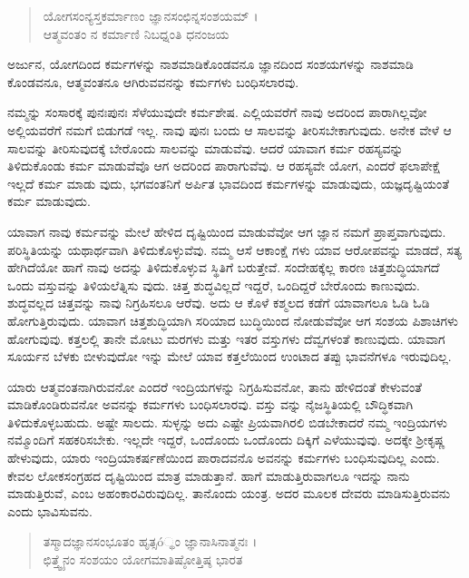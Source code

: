 \begin{verse}
ಯೋಗಸಂನ್ಯಸ್ತಕರ್ಮಾಣಂ ಜ್ಞಾನಸಂಛಿನ್ನಸಂಶಯಮ್ ।\\ಆತ್ಮವಂತಂ ನ ಕರ್ಮಾಣಿ ನಿಬಧ್ನಂತಿ ಧನಂಜಯ 
\end{verse}

{\small ಅರ್ಜುನ, ಯೋಗದಿಂದ ಕರ್ಮಗಳನ್ನು ನಾಶಮಾಡಿಕೊಂಡವನೂ ಜ್ಞಾನದಿಂದ ಸಂಶಯಗಳನ್ನು ನಾಶಮಾಡಿ ಕೊಂಡವನೂ, ಆತ್ಮವಂತನೂ ಆಗಿರುವವನನ್ನು ಕರ್ಮಗಳು ಬಂಧಿಸಲಾರವು.}

ನಮ್ಮನ್ನು ಸಂಸಾರಕ್ಕೆ ಪುನಃಪುನಃ ಸೆಳೆಯುವುದೇ ಕರ್ಮಶೇಷ. ಎಲ್ಲಿಯವರೆಗೆ ನಾವು ಅದರಿಂದ ಪಾರಾಗಿಲ್ಲವೋ ಅಲ್ಲಿಯವರೆಗೆ ನಮಗೆ ಬಿಡುಗಡೆ ಇಲ್ಲ. ನಾವು ಪುನಃ ಬಂದು ಆ ಸಾಲವನ್ನು ತೀರಿಸಬೇಕಾಗುವುದು. ಅನೇಕ ವೇಳೆ ಆ ಸಾಲವನ್ನು ತೀರಿಸುವುದಕ್ಕೆ ಬೇರೊಂದು ಸಾಲವನ್ನು ಮಾಡುವೆವು. ಆದರೆ ಯಾವಾಗ ಕರ್ಮ ರಹಸ್ಯವನ್ನು ತಿಳಿದುಕೊಂಡು ಕರ್ಮ ಮಾಡುವೆವೊ ಆಗ ಅದರಿಂದ ಪಾರಾಗುವೆವು. ಆ ರಹಸ್ಯವೇ ಯೋಗ, ಎಂದರೆ ಫಲಾಪೇಕ್ಷೆ ಇಲ್ಲದೆ ಕರ್ಮ ಮಾಡು ವುದು, ಭಗವಂತನಿಗೆ ಅರ್ಪಿತ ಭಾವದಿಂದ ಕರ್ಮಗಳನ್ನು ಮಾಡುವುದು, ಯಜ್ಞದೃಷ್ಟಿಯಂತೆ ಕರ್ಮ ಮಾಡುವುದು.

ಯಾವಾಗ ನಾವು ಕರ್ಮವನ್ನು ಮೇಲೆ ಹೇಳಿದ ದೃಷ್ಟಿಯಿಂದ ಮಾಡುವೆವೋ ಆಗ ಜ್ಞಾನ ನಮಗೆ ಪ್ರಾಪ್ತವಾಗುವುದು. ಪರಿಸ್ಥಿತಿಯನ್ನು ಯಥಾರ್ಥವಾಗಿ ತಿಳಿದುಕೊಳ್ಳುವೆವು. ನಮ್ಮ ಆಸೆ ಆಕಾಂಕ್ಷೆ ಗಳು ಯಾವ ಆರೋಪವನ್ನು ಮಾಡದೆ, ಸತ್ಯ ಹೇಗಿದೆಯೋ ಹಾಗೆ ನಾವು ಅದನ್ನು ತಿಳಿದುಕೊಳ್ಳುವ ಸ್ಥಿತಿಗೆ ಬರುತ್ತೇವೆ. ಸಂದೇಹಕ್ಕೆಲ್ಲ ಕಾರಣ ಚಿತ್ತಶುದ್ಧಿಯಾಗದೆ ಒಂದು ವಸ್ತುವನ್ನು ತಿಳಿಯಲೆತ್ನಿಸು ವುದು. ಚಿತ್ತ ಶುದ್ಧವಿಲ್ಲದೆ ಇದ್ದರೆ, ಒಂದಿದ್ದರೆ ಬೇರೊಂದು ಕಾಣುವುದು. ಶುದ್ಧವಲ್ಲದ ಚಿತ್ತವನ್ನು ನಾವು ನಿಗ್ರಹಿಸಲೂ ಆರೆವು. ಅದು ಆ ಕೊಳೆ ಕಶ್ಮಲದ ಕಡೆಗೆ ಯಾವಾಗಲೂ ಓಡಿ ಓಡಿ ಹೋಗುತ್ತಿರುವುದು. ಯಾವಾಗ ಚಿತ್ತಶುದ್ಧಿಯಾಗಿ ಸರಿಯಾದ ಬುದ್ಧಿಯಿಂದ ನೋಡುವೆವೋ ಆಗ ಸಂಶಯ ಪಿಶಾಚಿಗಳು ಹೋಗುವುವು. ಕತ್ತಲಲ್ಲಿ ತಾನೇ ಮೋಟು ಮರಗಳು ಮತ್ತು ಇತರ ವಸ್ತುಗಳು ದೆವ್ವಗಳಂತೆ ಕಾಣುವುದು. ಯಾವಾಗ ಸೂರ್ಯನ ಬೆಳಕು ಬೀಳುವುದೋ ಇನ್ನು ಮೇಲೆ ಯಾವ ಕತ್ತಲೆಯಿಂದ ಉಂಟಾದ ತಪ್ಪು ಭಾವನೆಗಳೂ ಇರುವುದಿಲ್ಲ.

ಯಾರು ಆತ್ಮವಂತನಾಗಿರುವನೋ ಎಂದರೆ ಇಂದ್ರಿಯಗಳನ್ನು ನಿಗ್ರಹಿಸುವನೋ, ತಾನು ಹೇಳಿದಂತೆ ಕೇಳುವಂತೆ ಮಾಡಿಕೊಂಡಿರುವನೋ ಅವನನ್ನು ಕರ್ಮಗಳು ಬಂಧಿಸಲಾರವು. ವಸ್ತು ವನ್ನು ನೈಜಸ್ಥಿತಿಯಲ್ಲಿ ಬೌದ್ಧಿಕವಾಗಿ ತಿಳಿದುಕೊಳ್ಳಬಹುದು. ಅಷ್ಟೇ ಸಾಲದು. ಸುಳ್ಳನ್ನು ಅದು ಎಷ್ಟೇ ಪ್ರಿಯವಾಗಿರಲಿ ಬಿಡಬೇಕಾದರೆ ನಮ್ಮ ಇಂದ್ರಿಯಗಳು ನಮ್ಮೊಂದಿಗೆ ಸಹಕರಿಸಬೇಕು. ಇಲ್ಲದೇ ಇದ್ದರೆ, ಒಂದೊಂದು ಒಂದೊಂದು ದಿಕ್ಕಿಗೆ ಎಳೆಯುವುವು. ಅದಕ್ಕೇ ಶ್ರೀಕೃಷ್ಣ ಹೇಳುವುದು, ಯಾರು ಇಂದ್ರಿಯಾಕರ್ಷಣೆಯಿಂದ ಪಾರಾದವನೊ ಅವನನ್ನು ಕರ್ಮಗಳು ಬಂಧಿಸುವುದಿಲ್ಲ ಎಂದು. ಕೇವಲ ಲೋಕಸಂಗ್ರಹದ ದೃಷ್ಟಿಯಿಂದ ಮಾತ್ರ ಮಾಡುತ್ತಾನೆ. ಹಾಗೆ ಮಾಡುತ್ತಿರುವಾಗಲೂ ಇದನ್ನು ನಾನು ಮಾಡುತ್ತಿರುವೆ, ಎಂಬ ಅಹಂಕಾರವಿರುವುದಿಲ್ಲ. ತಾನೊಂದು ಯಂತ್ರ. ಅದರ ಮೂಲಕ ದೇವರು ಮಾಡಿಸುತ್ತಿರುವನು ಎಂದು ಭಾವಿಸುವನು.\\

\begin{verse}
ತಸ್ಮಾದಜ್ಞಾನಸಂಭೂತಂ ಹೃತ್ಸó್ಥಂ ಜ್ಞಾನಾಸಿನಾತ್ಮನಃ ।\\ಛಿತ್ತ್ವೈನಂ ಸಂಶಯಂ ಯೋಗಮಾತಿಷ್ಠೋತ್ತಿಷ್ಠ ಭಾರತ 
\end{verse}

